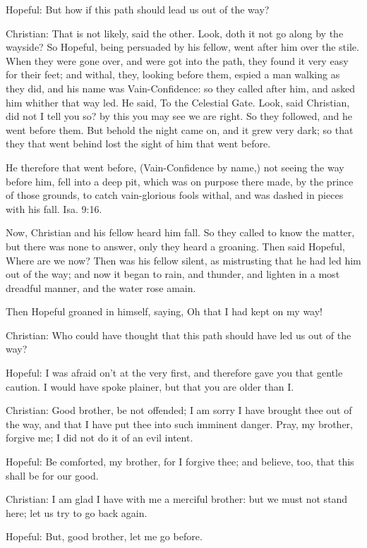 Hopeful: But how if this path should lead us out of the way?

Christian: That is not likely, said the other. Look, doth it not go along by the wayside? So Hopeful, being persuaded by his fellow, went after him over the stile. When they were gone over, and were got into the path, they found it very easy for their feet; and withal, they, looking before them, espied a man walking as they did, and his name was Vain-Confidence: so they called after him, and asked him whither that way led. He said, To the Celestial Gate. Look, said Christian, did not I tell you so? by this you may see we are right. So they followed, and he went before them. But behold the night came on, and it grew very dark; so that they that went behind lost the sight of him that went before.

He therefore that went before, (Vain-Confidence by name,) not seeing the way before him, fell into a deep pit, which was on purpose there made, by the prince of those grounds, to catch vain-glorious fools withal, and was dashed in pieces with his fall. Isa. 9:16.

Now, Christian and his fellow heard him fall. So they called to know the matter, but there was none to answer, only they heard a groaning. Then said Hopeful, Where are we now? Then was his fellow silent, as mistrusting that he had led him out of the way; and now it began to rain, and thunder, and lighten in a most dreadful manner, and the water rose amain.

Then Hopeful groaned in himself, saying, Oh that I had kept on my way!

Christian: Who could have thought that this path should have led us out of the way?

Hopeful: I was afraid on't at the very first, and therefore gave you that gentle caution. I would have spoke plainer, but that you are older than I.

Christian: Good brother, be not offended; I am sorry I have brought thee out of the way, and that I have put thee into such imminent danger. Pray, my brother, forgive me; I did not do it of an evil intent.

Hopeful: Be comforted, my brother, for I forgive thee; and believe, too, that this shall be for our good.

Christian: I am glad I have with me a merciful brother: but we must not stand here; let us try to go back again.

Hopeful: But, good brother, let me go before.

